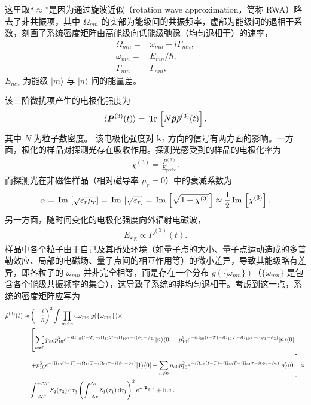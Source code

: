 \documentclass{thesis}
\begin{document}
这里取“$\approx$”是因为通过旋波近似（rotation wave approximation，简称 RWA）略去了非共振项，其中 $\Omega_{mn}$ 的实部为能级间的共振频率，虚部为能级间的退相干系数，刻画了系统密度矩阵由高能级向低能级弛豫（均匀退相干）的速率，
\begin{align}
    \Omega_{mn}=&\omega_{mn}-i\Gamma_{mn},\\
    \omega_{mn}=&E_{mn}/\hbar,\\
    \Gamma_{mn}=&\Gamma_{nm},
\end{align}
$E_{mn}$ 为能级 $\lvert m\rangle$ 与 $\lvert n\rangle$ 间的能量差。

该三阶微扰项产生的电极化强度为
\begin{align}
    \langle\bm{P}^{(3)}(t)\rangle=\,\mathrm{Tr}\,\left[N\hat{\bm{p}}\hat{\rho}^{(3)}(t)\right].
\end{align}
其中 $N$ 为粒子数密度。
该电极化强度对 $\bm{k}_2$ 方向的信号有两方面的影响。一方面，极化的样品对探测光存在吸收作用。探测光感受到的样品的电极化率为
\begin{align}
    \chi^{(3)}=\frac{P^{(3)}}{E_{\text{probe}}}.
\end{align}
而探测光在非磁性样品（相对磁导率 $\mu_r=0$）中的衰减系数为
\begin{align}
    \alpha=\,\mathrm{Im}\,\left[\sqrt{\varepsilon_r\mu_r}\right]=\,\mathrm{Im}\,\left[\sqrt{\varepsilon_r}\right]=\,\mathrm{Im}\,\left[\sqrt{1+\chi^{(3)}}\right]\approx\frac{1}{2}\,\mathrm{Im}\,\left[\chi^{(3)}\right].
\end{align}
另一方面，随时间变化的电极化强度向外辐射电磁波，
\begin{align}
    E_{\text{sig}}\propto\ddot{P}^{(3)}(t).
\end{align}
样品中各个粒子由于自己及其所处环境（如量子点的大小、量子点运动造成的多普勒效应、局部的电磁场、量子点间的相互作用等）的微小差异，导致其能级略有差异，即各粒子的 $\omega_{mn}$ 并非完全相等，而是存在一个分布 $g(\{\omega_{mn}\})$（$\{\omega_{mn}\}$ 是包含各个能级共振频率的集合），这导致了系统的非均匀退相干。考虑到这一点，系统的密度矩阵应写为
{\small
\begin{align}
    \label{Density matrix-Time domain-3rd order corrrection-2}
    \notag\hat{\rho}^{(3)}(t)\approx&\left(-\frac{i}{\hbar}\right)^3\int\prod_{m<n}\mathrm{d}\omega_{mn}\,g(\{\omega_{mn}\})\times\\
    \notag&\left[\sum_{n\neq 0}p_{n0}p_{10}^2e^{-i\Omega_{n0}(t-T)-i\Omega_{11}T-i\Omega_{10}\tau+i(\phi_1-\phi_2)}\lvert n\rangle\langle 0\rvert+p_{10}^3e^{-i\Omega_{10}(t-T)-i\Omega_{11}T-i\Omega_{10}\tau+i(\phi_1-\phi_2)}\lvert n\rangle\langle 0\rvert\right.\\
    \notag&\left.+p_{10}^3e^{-i\Omega_{10}(t-T)-i\Omega_{11}T-i\Omega_{01}\tau-i(\phi_1-\phi_2)}\lvert 1\rangle\langle 0\rvert+\sum_{n\neq 0}p_{n0}p_{10}^2e^{-i\Omega_{n0}(t-T)-i\Omega_{00}T-i\Omega_{01}\tau-i(\phi_1-\phi_2)}\lvert n\rangle\langle 0\rvert\right]\times\\
    &\int_{-\Delta T}^{+\Delta T}\mathcal{E}_2(\tau_3)\,\mathrm{d}\tau_3\left(\int_{-\Delta\tau}^{\Delta\tau}\mathcal{E}_1(\tau_1)\,\mathrm{d}\tau_1\right)^2e^{-i\bm{k}_2\cdot\bm{r}}+\text{h.c.}.
\end{align}
}
\end{document}
